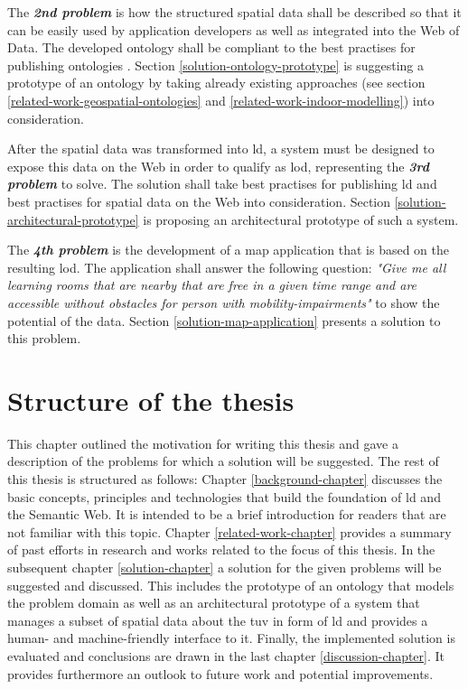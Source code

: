 \documentclass[draft,final]{vutinfth} %
\begin{document}
The \textbf{\textit{2nd problem}} is how the structured spatial data shall be described so that it can be easily used by application developers as well as integrated into the Web of Data. The developed ontology shall be compliant to the best practises for publishing ontologies \cite{berrueta_best_2008}. Section \ref{solution-ontology-prototype} is suggesting a prototype of an ontology by taking already existing approaches (see section \ref{related-work-geospatial-ontologies} and \ref{related-work-indoor-modelling}) into consideration.

After the spatial data was transformed into \gls{ld}, a system must be designed to expose this data on the Web in order to qualify as \gls{lod}, representing the \textbf{\textit{3rd problem}} to solve. The solution shall take best practises for publishing \gls{ld}\cite{hyland_best_2014} and best practises for spatial data on the Web\cite{tandy_spatial_2016} into consideration. Section \ref{solution-architectural-prototype} is proposing an architectural prototype of such a system.

The \textbf{\textit{4th problem}} is the development of a map application that is based on the resulting \gls{lod}. The application shall answer the following question: \textit{"Give me all learning rooms that are nearby that are free in a given time range and are accessible without obstacles for person with mobility-impairments"} to show the potential of the data. Section \ref{solution-map-application} presents a solution to this problem.

\section{Structure of the thesis}
This chapter outlined the motivation for writing this thesis and gave a description of the problems for which a solution will be suggested. The rest of this thesis is structured as follows: Chapter \ref{background-chapter} discusses the basic concepts, principles and technologies that build the foundation of \gls{ld} and the Semantic Web. It is intended to be a brief introduction for readers that are not familiar with this topic. Chapter \ref{related-work-chapter} provides a summary of past efforts in research and works related to the focus of this thesis. In the subsequent chapter \ref{solution-chapter} a solution for the given problems will be suggested and discussed. This includes the prototype of an ontology that models the problem domain as well as an architectural prototype of a system that manages a subset of spatial data about the \gls{tuv} in form of \gls{ld} and provides a human- and machine-friendly interface to it. Finally, the implemented solution is evaluated and conclusions are drawn in the last chapter \ref{discussion-chapter}. It provides furthermore an outlook to future work and potential improvements. 
\end{document}
